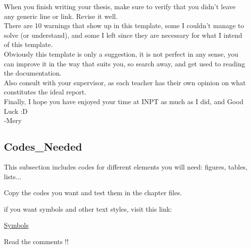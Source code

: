 When you finish writing your thesis, make sure to verify that you didn't leave any generic line or link. Revise it well.
\\

There are 10 warnings that show up in this template, some I couldn't manage to solve (or understand), and some I left since they are necessary for what I intend of this template.
\\

Obviously this template is only a suggestion, it is not perfect in any sense, you can improve it in the way that suits you, so search away, and get used to reading the documentation.
\\

Also consult with your supervisor, as each teacher has their own opinion on what constitutes the ideal report.
\\

Finally, I hope you have enjoyed your time at INPT as much as I did, and Good Luck :D
\\

-Mery


\subsection{Codes\_Needed}

This subsection includes codes for different elements you will need: figures, tables, lists...

Copy the codes you want and test them in the chapter files.

if you want symbols and other text styles, visit this link: 

\href{https://www.cmor-faculty.rice.edu/~heinken/latex/symbols.pdf}{Symbols}

Read the comments !!



